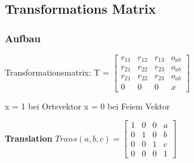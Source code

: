\clearpage


 \subsection{Transformations Matrix}
 \subsubsection{Aufbau}
 \begin{minipage}{10cm}
     Transformationsmatrix: T = $ 
     \begin{bmatrix} 
     r_{11} & r_{12} & r_{13} & o_{ab} \\
     r_{21} & r_{22} & r_{23} & o_{ab} \\
     r_{21} & r_{22} & r_{23} & o_{ab} \\
     0 & 0 & 0 & x                              
     \end{bmatrix}$
     
     x = 1 bei Ortsvektor \hspace{1cm} x = 0 bei Feiem Vektor
     
 \end{minipage}
 \begin{minipage}{0.33\linewidth}
     \textbf{Translation}\newline
     $Trans(a,b,c)=\begin{bmatrix}
     1 & 0 & 0 & a \\ 
     0 & 1 & 0 & b \\ 
     0 & 0 & 1 & c \\ 
     0 & 0 & 0 &  1
     \end{bmatrix}$
 \end{minipage}
 
